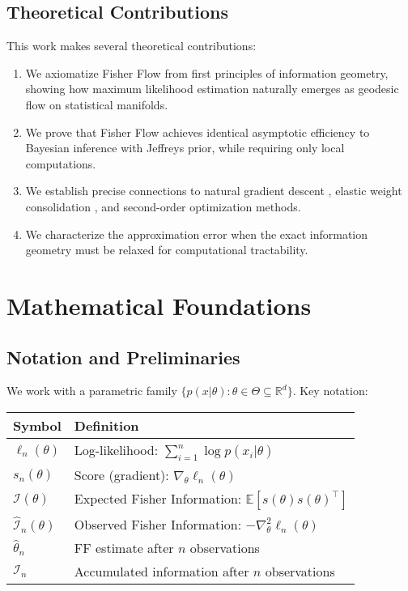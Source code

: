 \documentclass[11pt]{article}
\begin{document}
\subsection{Theoretical Contributions}
This work makes several theoretical contributions:
\begin{enumerate}
\item We axiomatize Fisher Flow from first principles of information geometry, showing how maximum likelihood estimation naturally emerges as geodesic flow on statistical manifolds.
\item We prove that Fisher Flow achieves identical asymptotic efficiency to Bayesian inference with Jeffreys prior, while requiring only local computations.
\item We establish precise connections to natural gradient descent \cite{amari1998natural}, elastic weight consolidation \cite{kirkpatrick2017overcoming}, and second-order optimization methods.
\item We characterize the approximation error when the exact information geometry must be relaxed for computational tractability.
\end{enumerate}

\section{Mathematical Foundations}

\subsection{Notation and Preliminaries}

We work with a parametric family $\{p(x|\theta) : \theta \in \Theta \subseteq \mathbb{R}^d\}$. Key notation:

\begin{center}
\begin{tabular}{ll}
\toprule
\textbf{Symbol} & \textbf{Definition} \\
\midrule
$\ell_n(\theta)$ & Log-likelihood: $\sum_{i=1}^n \log p(x_i|\theta)$ \\
$s_n(\theta)$ & Score (gradient): $\nabla_\theta \ell_n(\theta)$ \\
$\mathcal{I}(\theta)$ & Expected Fisher Information: $\mathbb{E}[s(\theta)s(\theta)^\top]$ \\
$\hat{\mathcal{I}}_n(\theta)$ & Observed Fisher Information: $-\nabla^2_\theta \ell_n(\theta)$ \\
$\hat{\theta}_n$ & FF estimate after $n$ observations \\
$\mathcal{I}_n$ & Accumulated information after $n$ observations \\
\bottomrule
\end{tabular}
\end{center}
\end{document}
